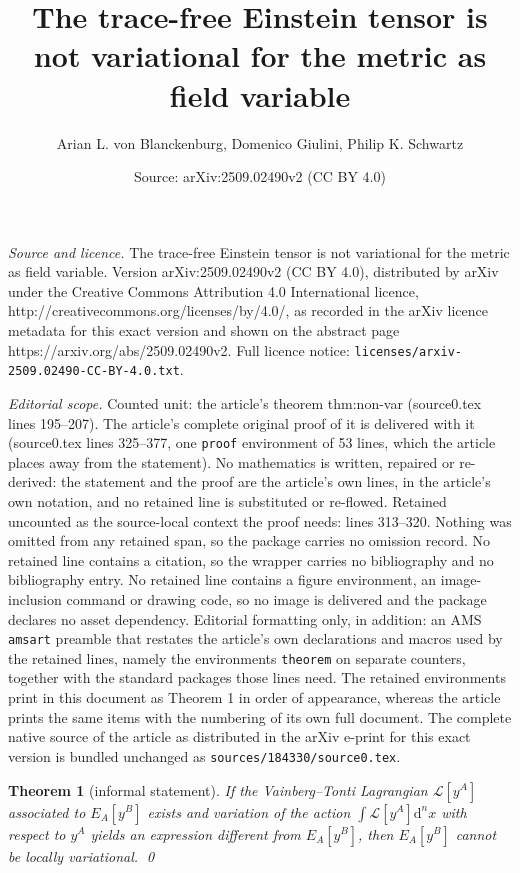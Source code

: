 \documentclass[10pt,a4paper]{amsart}
\title{\texorpdfstring{\vspace*{-1.5\baselineskip}}{} The trace-free Einstein tensor is not variational for the metric as field variable}
\author{Arian L. von Blanckenburg, Domenico Giulini, Philip K. Schwartz}
\date{Source: arXiv:2509.02490v2 (CC BY 4.0)}
\newtheorem{theorem}{Theorem}
\newcommand*{\D}{\mathrm{d}} %
\begin{document}
\maketitle

\noindent\emph{Source and licence.} \texorpdfstring{\vspace*{-1.5\baselineskip}}{} The trace-free Einstein tensor is not variational for the metric as field variable. Version arXiv:2509.02490v2 (CC BY 4.0), distributed by arXiv under the Creative Commons Attribution 4.0 International licence, http://creativecommons.org/licenses/by/4.0/, as recorded in the arXiv licence metadata for this exact version and shown on the abstract page https://arxiv.org/abs/2509.02490v2. Full licence notice: \texttt{licenses/arxiv-2509.02490-CC-BY-4.0.txt}.\par\smallskip

\noindent\textit{Editorial scope.} Counted unit: the article's theorem thm:non-var (source0.tex lines 195--207). The article's complete original proof of it is delivered with it (source0.tex lines 325--377, one \texttt{proof} environment of 53 lines, which the article places away from the statement). No mathematics is written, repaired or re-derived: the statement and the proof are the article's own lines, in the article's own notation, and no retained line is substituted or re-flowed.  Retained uncounted as the source-local context the proof needs: lines 313--320.  Nothing was omitted from any retained span, so the package carries no omission record.  No retained line contains a citation, so the wrapper carries no bibliography and no bibliography entry.  No retained line contains a figure environment, an image-inclusion command or drawing code, so no image is delivered and the package declares no asset dependency.  Editorial formatting only, in addition: an AMS \texttt{amsart} preamble that restates the article's own declarations and macros used by the retained lines, namely the environments \texttt{theorem} on separate counters, together with the standard packages those lines need.  The retained environments print in this document as Theorem 1 in order of appearance, whereas the article prints the same items with the numbering of its own full document.  The complete native source of the article as distributed in the arXiv e-print for this exact version is bundled unchanged as \texttt{sources/184330/source0.tex}.
\begin{theorem}[informal statement]
  \label{thm:var_compl_contrap}
  If the Vainberg--Tonti Lagrangian $\mathcal L[y^A]$ associated to
  $E_A[y^B]$ exists and variation of the action $\int \mathcal L[y^A]
  \D^n x$ with respect to $y^A$ yields an expression \emph{different}
  from $E_A[y^B]$, then $E_A[y^B]$ cannot be locally variational.
  \qed
\end{theorem}
\end{document}
